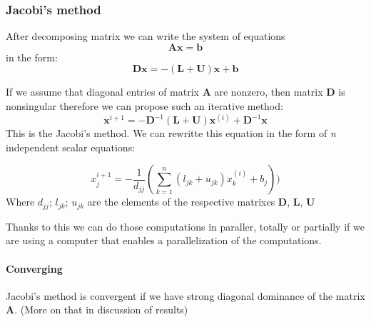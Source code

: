 \documentclass[12pt]{report}
\begin{document}
\subsubsection{Jacobi's method}
After decomposing matrix we can write the system of equations
\[ \mathbf{A}\mathbf{x} = \mathbf{b} \]
in the form:
\[ \mathbf{D}\mathbf{x} = -(\mathbf{L}+\mathbf{U})\mathbf{x}+\mathbf{b}
\]

If we assume that diagonal entries of matrix \textbf{A} are nonzero, then matrix \textbf{D} is nonsingular therefore we can propose such an iterative method:
\[ \mathbf{x}^{i+1} = -\mathbf{D}^{-1}(\mathbf{L}+\mathbf{U})\mathbf{x}^{(i)}+\mathbf{D}^{-1}\mathbf{x}
\]
This is the Jacobi's method.
We can rewritte this equation in the form of \textit{n} independent scalar equations:

\[
{x}_j^{i+1} = -\frac{1}{d_{jj}}(
\sum^n_{k=1} (l_{jk} + u_{jk})x_k^{(i)}+b_j)
) \]
Where $d_{jj}$; $l_{jk}$;  $u_{jk}$ are the elements of the respective matrixes \textbf{D}, \textbf{L}, \textbf{U}

Thanks to this we can do those computations in paraller, totally or partially if we are using a computer that enables a parallelization of the computations.

\paragraph{Converging}
Jacobi's method is convergent if we have strong diagonal dominance of the matrix \textbf{A}. (More on that in discussion of results)
\end{document}
